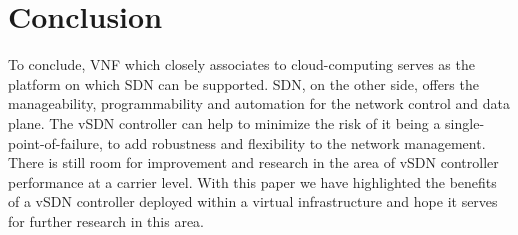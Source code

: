 \documentclass[sigconf]{Template}
\begin{document}
\section{Conclusion}

To conclude, VNF which closely associates to cloud-computing serves as the platform on which SDN can be supported. SDN, on the other side, offers the manageability, programmability and automation for the network control and data plane. The vSDN controller can help to minimize the risk of it being a single-point-of-failure, to add robustness and flexibility to the network management. There is still room for improvement and research in the area of vSDN controller performance at a carrier level. With this paper we have highlighted the benefits of a vSDN controller deployed within a virtual infrastructure and hope it serves for further research in this area.



\end{document}
